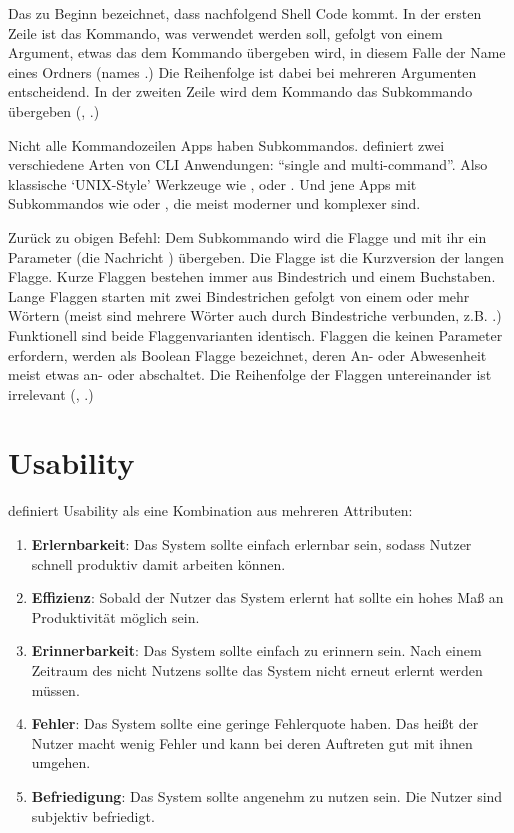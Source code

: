 \documentclass[oneside,bibliography=totocnumbered,BCOR=5mm]{scrbook}
\begin{document}
Das \codeinline{$} zu Beginn bezeichnet, dass nachfolgend Shell Code kommt. In
der ersten Zeile ist  das Kommando, was verwendet werden soll,
gefolgt von einem Argument, etwas das dem Kommando übergeben wird, in diesem
Falle der Name eines Ordners (names .) Die Reihenfolge
ist dabei bei mehreren Argumenten entscheidend. In der zweiten Zeile wird
dem  Kommando das Subkommando  übergeben
(\textcite{nagarajan2018}, \textcite{clig}.)

Nicht alle Kommandozeilen Apps haben Subkommandos. \textcite{12factor} definiert
zwei verschiedene Arten von CLI Anwendungen: ``single and multi-command''. Also
klassische `UNIX-Style' Werkzeuge wie ,  oder
. Und jene Apps mit Subkommandos wie  oder
, die meist moderner und komplexer sind.

Zurück zu obigen  Befehl: Dem  Subkommando
wird die  Flagge und mit ihr ein Parameter (die Nachricht
) übergeben. Die  Flagge ist die
Kurzversion der langen  Flagge. Kurze Flaggen bestehen
immer aus Bindestrich und einem Buchstaben. Lange Flaggen starten mit zwei
Bindestrichen gefolgt von einem oder mehr Wörtern (meist sind mehrere Wörter
auch durch Bindestriche verbunden, z.B. .)
Funktionell sind beide Flaggenvarianten identisch. Flaggen die keinen Parameter
erfordern, werden als Boolean Flagge bezeichnet, deren An- oder Abwesenheit
meist etwas an- oder abschaltet. Die Reihenfolge der Flaggen untereinander ist
irrelevant (\textcite{nagarajan2018}, \textcite{clig}.)

\section{Usability}
\label{sec:usability}

\textcite[26]{nielsen1993} definiert Usability als eine Kombination aus mehreren
Attributen:

\begin{enumerate}
  \item \textbf{Erlernbarkeit}:
    Das System sollte einfach erlernbar sein, sodass Nutzer schnell produktiv damit arbeiten können.
  \item \textbf{Effizienz}:
    Sobald der Nutzer das System erlernt hat sollte ein hohes Maß an Produktivität möglich sein.
  \item \textbf{Erinnerbarkeit}:
    Das System sollte einfach zu erinnern sein. Nach einem Zeitraum des nicht Nutzens sollte das System nicht erneut erlernt werden müssen.
  \item \textbf{Fehler}:
    Das System sollte eine geringe Fehlerquote haben. Das heißt der Nutzer macht wenig Fehler und kann bei deren Auftreten gut mit ihnen umgehen.
  \item \textbf{Befriedigung}:
    Das System sollte angenehm zu nutzen sein. Die Nutzer sind subjektiv befriedigt.
\end{enumerate}
\end{document}
